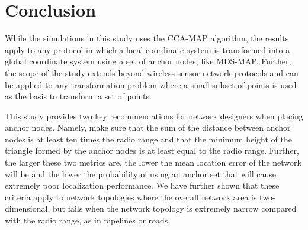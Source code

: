 \chapter{Conclusion}

While the simulations in this study uses the CCA-MAP algorithm, the results apply to any protocol in which a local coordinate system is transformed into a global coordinate system using a set of anchor nodes, like MDS-MAP.  Further, the scope of the study extends beyond wireless sensor network protocols and can be applied to any transformation problem where a small subset of points is used as the basis to transform a set of points.

This study provides two key recommendations for network designers when placing anchor nodes.  Namely, make sure that the sum of the distance between anchor nodes is at least ten times the radio range and that the minimum height of the triangle formed by the anchor nodes is at least equal to the radio range.  Further, the larger these two metrics are, the lower the mean location error of the network will be and the lower the probability of using an anchor set that will cause extremely poor localization performance.  We have further shown that these criteria apply to network topologies where the overall network area is two-dimensional, but fails when the network topology is extremely narrow compared with the radio range, as in pipelines or roads.


